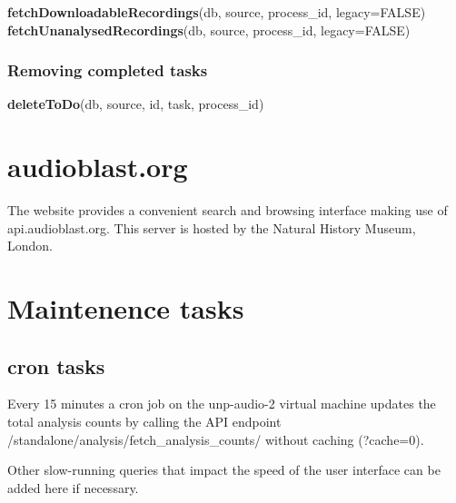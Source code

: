 \documentclass[
]{book}
\newenvironment{Shaded}{\begin{snugshade}}{\end{snugshade}}
\newcommand{\AttributeTok}[1]{\textcolor[rgb]{0.13,0.29,0.53}{#1}}
\newcommand{\ConstantTok}[1]{\textcolor[rgb]{0.56,0.35,0.01}{#1}}
\newcommand{\FunctionTok}[1]{\textcolor[rgb]{0.13,0.29,0.53}{\textbf{#1}}}
\newcommand{\NormalTok}[1]{#1}
\begin{document}
\begin{Shaded}
\begin{Highlighting}[]
\FunctionTok{fetchDownloadableRecordings}\NormalTok{(db, source, process\_id, }\AttributeTok{legacy=}\ConstantTok{FALSE}\NormalTok{)}
\FunctionTok{fetchUnanalysedRecordings}\NormalTok{(db, source, process\_id, }\AttributeTok{legacy=}\ConstantTok{FALSE}\NormalTok{)}
\end{Highlighting}
\end{Shaded}

\hypertarget{removing-completed-tasks}{%
\subsection{Removing completed tasks}\label{removing-completed-tasks}}

\begin{Shaded}
\begin{Highlighting}[]
\FunctionTok{deleteToDo}\NormalTok{(db, source, id, task, process\_id)}
\end{Highlighting}
\end{Shaded}

\hypertarget{audioblast.org}{%
\chapter{audioblast.org}\label{audioblast.org}}

The website provides a convenient search and browsing interface making use of api.audioblast.org. This server is hosted by the Natural History Museum, London.

\hypertarget{maintenence-tasks}{%
\chapter{Maintenence tasks}\label{maintenence-tasks}}

\hypertarget{cron-tasks}{%
\section{cron tasks}\label{cron-tasks}}

Every 15 minutes a cron job on the unp-audio-2 virtual machine updates the total analysis counts by calling the API endpoint /standalone/analysis/fetch\_analysis\_counts/ without caching (?cache=0).

Other slow-running queries that impact the speed of the user interface can be added here if necessary.

  
\end{document}
